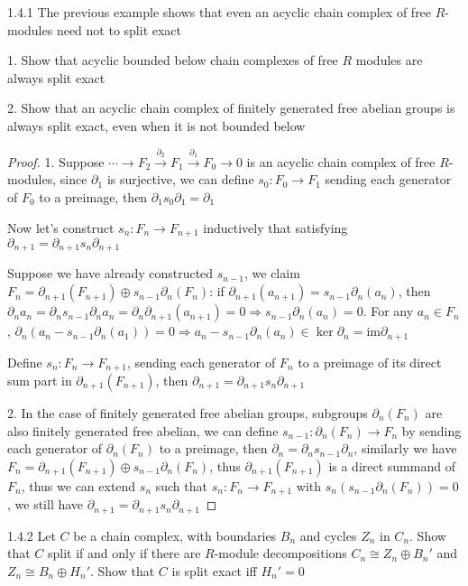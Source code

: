 \documentclass[../main.tex]{subfiles}
\begin{document}
\begin{customexercise}{1.4.1}
The previous example shows that even an acyclic chain complex of free $R$-modules need not to split exact \par
1. Show that acyclic bounded below chain complexes of free $R$ modules are always split exact \par
2. Show that an acyclic chain complex of finitely generated free abelian groups is always split exact, even when it is not bounded below
\end{customexercise}

\begin{proof}
1. Suppose $\cdots\to F_2\xrightarrow{\partial_2}F_1\xrightarrow{\partial_1}F_0\to0$ is an acyclic chain complex of free $R$-modules, since $\partial_1$ is surjective, we can define $s_0:F_0\to F_1$ sending each generator of $F_0$ to a preimage, then $\partial_1s_0\partial_1=\partial_1$ \par
Now let's construct $s_n:F_n\to F_{n+1}$ inductively that satisfying $\partial_{n+1}=\partial_{n+1}s_n\partial_{n+1}$ \par
Suppose we have already constructed $s_{n-1}$, we claim $F_n=\partial_{n+1}(F_{n+1})\oplus s_{n-1}\partial_n(F_n)$: if $\partial_{n+1}(a_{n+1})=s_{n-1}\partial_n(a_n)$, then $\partial_na_n=\partial_ns_{n-1}\partial_na_n=\partial_n\partial_{n+1}(a_{n+1})=0\Rightarrow s_{n-1}\partial_n(a_n)=0$. For any $a_n\in F_n$, $\partial_n(a_n-s_{n-1}\partial_n(a_1))=0\Rightarrow a_n-s_{n-1}\partial_n(a_n)\in\ker\partial_n=\mathrm{im}\partial_{n+1}$ \par
Define $s_n:F_n\to F_{n+1}$, sending each generator of $F_n$ to a preimage of its direct sum part in $\partial_{n+1}(F_{n+1})$, then $\partial_{n+1}=\partial_{n+1}s_n\partial_{n+1}$ \par
2. In the case of finitely generated free abelian groups, subgroups $\partial_n(F_n)$ are also finitely generated free abelian, we can define $s_{n-1}:\partial_n(F_n)\to F_n$ by sending each generator of $\partial_n(F_n)$ to a preimage, then $\partial_n=\partial_ns_{n-1}\partial_n$, similarly we have $F_n=\partial_{n+1}(F_{n+1})\oplus s_{n-1}\partial_n(F_n)$, thus $\partial_{n+1}(F_{n+1})$ is a direct summand of $F_n$, thus we can extend $s_n$ such that $s_n:F_n\to F_{n+1}$ with $s_n(s_{n-1}\partial_n(F_n))=0$, we still have $\partial_{n+1}=\partial_{n+1}s_n\partial_{n+1}$
\end{proof}

\begin{customexercise}{1.4.2}
Let $C$ be a chain complex, with boundaries $B_n$ and cycles $Z_n$ in $C_n$. Show that $C$ split if and only if there are $R$-module decompositions $C_n\cong Z_n\oplus B_n'$ and $Z_n\cong B_n\oplus H_n'$. Show that $C$ is split exact iff $H_n'=0$
\end{customexercise}
\end{document}
